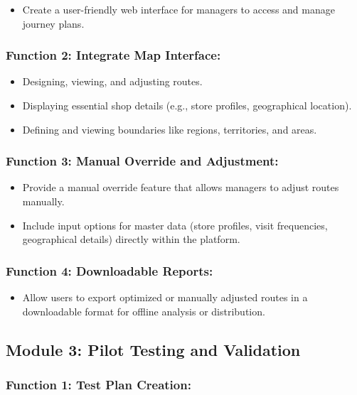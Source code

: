 \begin{itemize}
    \item Create a user-friendly web interface for managers to access and manage journey plans.
\end{itemize}
\subsubsection*{Function 2: Integrate Map Interface:
}

    \begin{itemize}
        \item Designing, viewing, and adjusting routes.
        \item Displaying essential shop details (e.g., store profiles, geographical location).
        \item Defining and viewing boundaries like regions, territories, and areas.
    \end{itemize}

\subsubsection*{Function 3: Manual Override and Adjustment: 
}

\begin{itemize}
    \item Provide a manual override feature that allows managers to adjust routes manually.
    \item Include input options for master data (store profiles, visit frequencies, geographical details) directly within the platform.
\end{itemize}

\subsubsection*{Function 4: Downloadable Reports: 
}

\begin{itemize}
    \item Allow users to export optimized or manually adjusted routes in a downloadable format for offline analysis or distribution.
\end{itemize}

\subsection*{Module 3: Pilot Testing and Validation }

\subsubsection*{Function 1: Test Plan Creation: 
}

